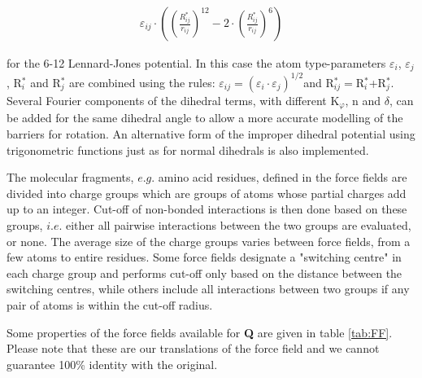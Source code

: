 \documentclass[a4paper,10pt]{article}
\begin{document}
\begin{align}
\varepsilon_{ij} \cdot \left( {\left( {\frac{R_{ij}^\ast
}{r_{ij}}} \right)^{12}-2\cdot \left( {\frac{R_{ij}^\ast
}{r_{ij}}} \right)^6} \right)
\end{align}
  
for the 6-12 Lennard-Jones potential. In this case the atom
type-parameters $\varepsilon _{i}$, $\varepsilon _{j}$,
R$^{\ast}_{i}$ and R$^{\ast }_{j}$ are combined using the rules:
$\varepsilon _{ij}=(\varepsilon _{i}\cdot \varepsilon
_{j})^{1/2}$and R$^{\ast}_{ij} = $R$^{\ast}_{i}$+R$^{\ast}_{j}$.
Several Fourier components of the dihedral terms, with different
K$_{\varphi }$, n and $\delta $, can be added for the same
dihedral angle to allow a more accurate modelling of the barriers
for rotation. An alternative form of the improper dihedral
potential using trigonometric functions just as for normal
dihedrals is also implemented.

The molecular  fragments, $e.g.$ amino  acid residues, defined  in the
force fields are divided into charge  groups which are groups of atoms
whose  partial charges  add up  to an  integer. Cut-off  of non-bonded
interactions is  then done  based on these  groups, $i.e.$  either all
pairwise  interactions  between  the  two  groups  are  evaluated,  or
none.  The average  size of  the  charge groups  varies between  force
fields,  from  a few  atoms  to  entire  residues. Some  force  fields
designate  a "switching  centre"  in each  charge  group and  performs
cut-off  only based  on the  distance between  the switching  centres,
while others include  all interactions between two groups  if any pair
of atoms is within the cut-off radius.

Some properties of the force fields available for \textbf{Q} are given in table
\ref{tab:FF}. Please note that these are our translations of the force
field and we cannot guarantee 100\% identity with the original.
\end{document}
